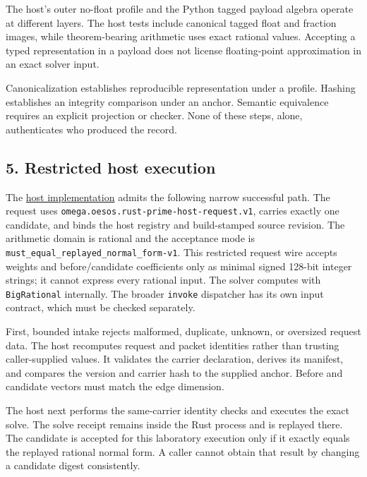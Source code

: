 \documentclass[
  11pt,
]{article}
\newcommand{\passthrough}[1]{#1}
\begin{document}
The host's outer no-float profile and the Python tagged payload algebra
operate at different layers. The host tests include canonical tagged
float and fraction images, while theorem-bearing arithmetic uses exact
rational values. Accepting a typed representation in a payload does not
license floating-point approximation in an exact solver input.

Canonicalization establishes reproducible representation under a
profile. Hashing establishes an integrity comparison under an anchor.
Semantic equivalence requires an explicit projection or checker. None of
these steps, alone, authenticates who produced the record.

\subsection{5. Restricted host
execution}\label{restricted-host-execution}

The
\href{https://github.com/dbccpage/the_symbol_game/blob/52cb5457f6c485ba548cfd292f6012a941ed22cf/omega_engine/crates_rs/omega_symbol_game/src/host.rs}{host
implementation} admits the following narrow successful path. The request
uses \nolinkurl{omega.oesos.rust-prime-host-request.v1}, carries exactly
one candidate, and binds the host registry and build-stamped source
revision. The arithmetic domain is rational and the acceptance mode is
\nolinkurl{must_equal_replayed_normal_form-v1}. This restricted request
wire accepts weights and before/candidate coefficients only as minimal
signed 128-bit integer strings; it cannot express every rational input.
The solver computes with \passthrough{\lstinline!BigRational!}
internally. The broader \passthrough{\lstinline!invoke!} dispatcher has
its own input contract, which must be checked separately.

First, bounded intake rejects malformed, duplicate, unknown, or
oversized request data. The host recomputes request and packet
identities rather than trusting caller-supplied values. It validates the
carrier declaration, derives its manifest, and compares the version and
carrier hash to the supplied anchor. Before and candidate vectors must
match the edge dimension.

The host next performs the same-carrier identity checks and executes the
exact solve. The solve receipt remains inside the Rust process and is
replayed there. The candidate is accepted for this laboratory execution
only if it exactly equals the replayed rational normal form. A caller
cannot obtain that result by changing a candidate digest consistently.
\end{document}

